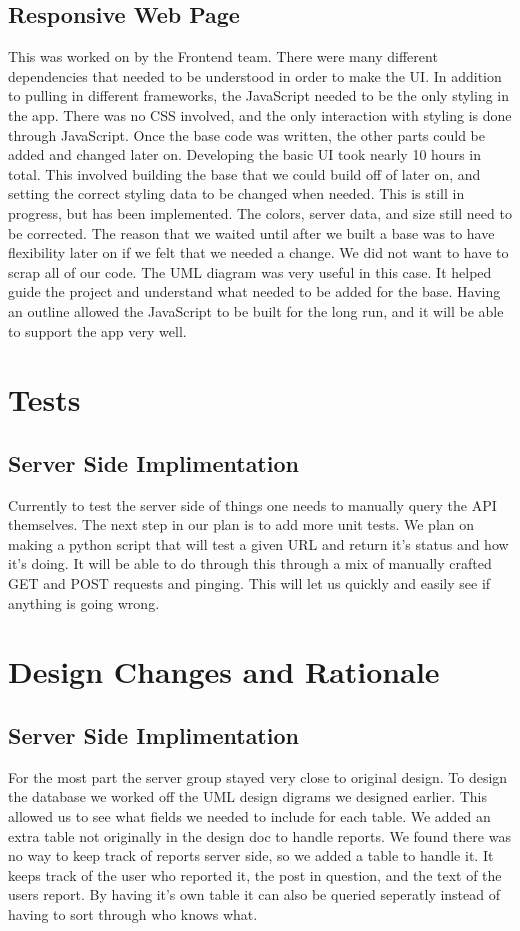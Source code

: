 \documentclass[12pt]{article}
\begin{document}
      \subsection{Responsive Web Page}
      This was worked on by the Frontend team. There were many different dependencies that needed to be understood in order to make the UI. In addition to pulling in different frameworks, the JavaScript needed to be the only styling in the app. There was no CSS involved, and the only interaction with styling is done through JavaScript. Once the base code was written, the other parts could be added and changed later on. Developing the basic UI took nearly 10 hours in total. This involved building the base that we could build off of later on, and setting the correct styling data to be changed when needed. This is still in progress, but has been implemented. The colors, server data, and size still need to be corrected. The reason that we waited until after we built a base was to have flexibility later on if we felt that we needed a change. We did not want to have to scrap all of our code. The UML diagram was very useful in this case. It helped guide the project and understand what needed to be added for the base. Having an outline allowed the JavaScript to be built for the long run, and it will be able to support the app very well.
\section{Tests}
\subsection{Server Side Implimentation}
Currently to test the server side of things one needs to manually query the API themselves.  The next step in our plan is to add more unit tests.  We plan on making a python script that will test a given URL and return it's status and how it's doing.  It will be able to do through this through a mix of manually crafted GET and POST requests and pinging.  This will let us quickly and easily see if anything is going wrong.
\section{Design Changes and Rationale}
\subsection{Server Side Implimentation}
For the most part the server group stayed very close to original design.  To design the database we worked off the UML design digrams we designed earlier.  This allowed us to see what fields we needed to include for each table.  We added an extra table not originally in the design doc to handle reports.  We found there was no way to keep track of reports server side, so we added a table to handle it.  It keeps track of the user who reported it, the post in question, and the text of the users report.  By having it's own table it can also be queried seperatly instead of having to sort through who knows what.
\end{document}
